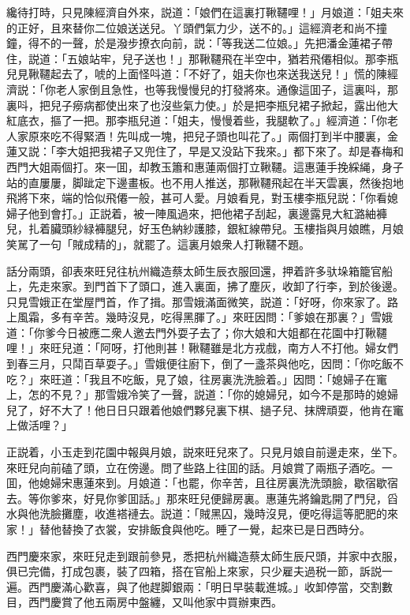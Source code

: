 纔待打時，只見陳經濟自外來，説道：「娘們在這裏打鞦韆哩！」月娘道：「姐夫來的正好，且來替你二位娘送送兒。丫頭們氣力少，送不的。」這經濟老和尚不撞鐘，得不的一聲，於是潑步撩衣向前，説：「等我送二位娘。」先把潘金蓮裙子帶住，説道：「五娘站牢，兒子送也！」那鞦韆飛在半空中，猶若飛僊相似。那李瓶兒見鞦韆起去了，唬的上面怪呌道：「不好了，姐夫你也來送我送兒！」慌的陳經濟説：「你老人家倒且急性，也等我慢慢兒的打發將來。通像這囬子，這裏呌，那裏呌，把兒子癆病都使出來了也沒些氣力使。」於是把李瓶兒裙子掀起，露出他大紅底衣，摳了一把。那李瓶兒道：「姐夫，慢慢着些，我腿軟了。」經濟道：「你老人家原來吃不得緊酒！先叫成一塊，把兒子頭也叫花了。」兩個打到半中腰裏，金蓮又説：「李大姐把我裙子又兜住了，早是又没跕下我來。」都下來了。却是春梅和西門大姐兩個打。來一囬，却教玉簫和惠蓮兩個打立鞦韆。這惠蓮手挽綵䋲，身子站的直屢屢，脚跐定下邊畫板。也不用人推送，那鞦韆飛起在半天雲裏，然後抱地飛將下來，端的恰似飛僊一般，甚可人愛。月娘看見，對玉樓李瓶兒説：「你看媳婦子他到會打。」正説着，被一陣風過來，把他裙子刮起，裏邊露見大紅潞紬褲兒，扎着臟頭紗緑褲腿兒，好玉色納紗護膝，銀紅線帶兒。玉樓指與月娘瞧，月娘笑駡了一句「賊成精的」，就罷了。這裏月娘衆人打鞦韆不題。

話分兩頭，卻表來旺兒往杭州織造蔡太師生辰衣服回還，押着許多驮垛箱籠官船上，先走來家。到門首下了頭口，進入裏面，拂了塵灰，收卸了行李，到於後邊。只見雪娥正在堂屋門首，作了揖。那雪娥滿面微笑，説道：「好呀，你來家了。路上風霜，多有辛苦。幾時沒見，吃得黑腪了。」來旺因問：「爹娘在那裏？」雪娥道：「你爹今日被應二衆人邀去門外耍子去了；你大娘和大姐都在花園中打鞦韆哩！」來旺兒道：「阿呀，打他則甚！鞦韆雖是北方戎戲，南方人不打他。婦女們到春三月，只鬦百草耍子。」雪娥便往廚下，倒了一盞茶與他吃，因問：「你吃飯不吃？」來旺道：「我且不吃飯，見了娘，往房裏洗洗臉着。」因問：「媳婦子在竃上，怎的不見？」那雪娥冷笑了一聲，説道：「你的媳婦兒，如今不是那時的媳婦兒了，好不大了！他日日只跟着他娘們夥兒裏下棋、撾子兒、抹牌頑耍，他肯在竃上做活哩？」

正説着，小玉走到花園中報與月娘，説來旺兒來了。只見月娘自前邊走來，坐下。來旺兒向前磕了頭，立在傍邊。問了些路上往囬的話。月娘賞了兩瓶子酒吃。一囬，他媳婦宋惠蓮來到。月娘道：「也罷，你辛苦，且往房裏洗洗頭臉，歇宿歇宿去。等你爹來，好見你爹囬話。」那來旺兒便歸房裏。惠蓮先將鑰匙開了門兒，舀水與他洗臉攤塵，收進褡褳去。説道：「賊黑囚，幾時沒見，便吃得這等肥肥的來家！」替他替換了衣裳，安排飯食與他吃。睡了一覺，起來已是日西時分。

西門慶來家，來旺兒走到跟前參見，悉把杭州織造蔡太師生辰尺頭，并家中衣服，俱已完備，打成包裹，裝了四箱，搭在官船上來家，只少雇夫過税一節，訴説一遍。西門慶滿心歡喜，與了他趕脚銀兩：「明日早裝載進城。」收卸停當，交割數目，西門慶賞了他五兩房中盤纏，又叫他家中買辦東西。

